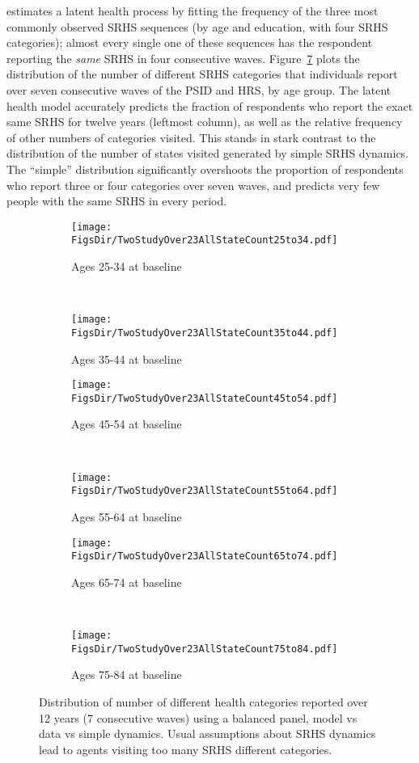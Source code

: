 \documentclass[12pt,pdftex,letterpaper]{article}
\newcommand{\RootDir}{..}
\newcommand{\FigsDir}{\RootDir/Figures}
\begin{document}
\cite{Halliday11} estimates a latent health process by fitting the frequency of the three most commonly observed SRHS sequences (by age and education, with four SRHS categories); almost every single one of these sequences has the respondent reporting the \textit{same} SRHS in four consecutive waves. Figure~\ref{fig:StateCountTwoStudy} plots the distribution of the number of different SRHS categories that individuals report over seven consecutive waves of the PSID and HRS, by age group. The latent health model accurately predicts the fraction of respondents who report the exact same SRHS for twelve years (leftmost column), as well as the relative frequency of other numbers of categories visited. This stands in stark contrast to the distribution of the number of states visited generated by simple SRHS dynamics. The ``simple'' distribution significantly overshoots the proportion of respondents who report three or four categories over seven waves, and predicts very few people with the same SRHS in every period. 

\begin{figure}
	\centering
	\begin{subfigure}[b]{0.48\textwidth}
		\texttt{[image: \\FigsDir/TwoStudyOver23AllStateCount25to34.pdf]}
		\caption{Ages 25-34 at baseline}\label{fig:StateCount25to34}
	\end{subfigure}
	~
	\begin{subfigure}[b]{0.48\textwidth}
		\texttt{[image: \\FigsDir/TwoStudyOver23AllStateCount35to44.pdf]}
		\caption{Ages 35-44 at baseline}\label{fig:StateCount35to44}
	\end{subfigure}
	
	\begin{subfigure}[b]{0.48\textwidth}
		\texttt{[image: \\FigsDir/TwoStudyOver23AllStateCount45to54.pdf]}
		\caption{Ages 45-54 at baseline}\label{fig:StateCount45to54}
	\end{subfigure}
	~
	\begin{subfigure}[b]{0.48\textwidth}
		\texttt{[image: \\FigsDir/TwoStudyOver23AllStateCount55to64.pdf]}
		\caption{Ages 55-64 at baseline}\label{fig:StateCount55to64}
	\end{subfigure}
	
	
	\begin{subfigure}[b]{0.48\textwidth}
		\texttt{[image: \\FigsDir/TwoStudyOver23AllStateCount65to74.pdf]}
		\caption{Ages 65-74 at baseline}\label{fig:StateCount65to74}
	\end{subfigure}
	~
	\begin{subfigure}[b]{0.48\textwidth}
		\texttt{[image: \\FigsDir/TwoStudyOver23AllStateCount75to84.pdf]}
		\caption{Ages 75-84 at baseline}\label{fig:StateCount75to84}
	\end{subfigure}
	\caption{Distribution of number of different health categories reported over 12 years (7 consecutive waves) using a balanced panel, model vs data vs simple dynamics. Usual assumptions about SRHS dynamics lead to agents visiting too many SRHS different categories.}\label{fig:StateCountTwoStudy}
\end{figure}
\end{document}
